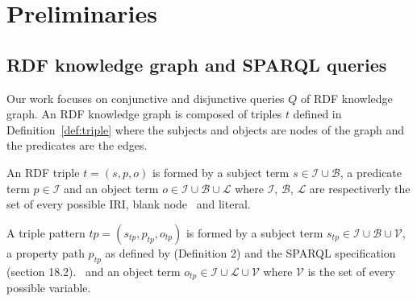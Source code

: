\section{Preliminaries}






\subsection{RDF knowledge graph and SPARQL queries}
Our work focuses on conjunctive and disjunctive queries $Q$ of RDF knowledge graph.
An RDF knowledge graph is composed of triples $t$ defined in Definition~\ref{def:triple} where the subjects and objects are nodes of the graph and the predicates are the edges.

\begin{definition}\label{def:triple}
    An RDF triple $t = (s,p,o)$ is formed by a subject term $s \in \mathcal{I} \cup \mathcal{B}$, a predicate term  $p \in \mathcal{I}$ and an object term $o \in \mathcal{I} \cup \mathcal{B} \cup \mathcal{L}$
    where $\mathcal{I}$, $\mathcal{B}$, $\mathcal{L}$ are respectiverly the set of every possible IRI, blank node~ and literal.
\end{definition}

\begin{definition}\label{def:triplePattern}
    A triple pattern $tp = (s_{tp},p_{tp},o_{tp})$ is formed by a subject term $s_{tp} \in \mathcal{I} \cup \mathcal{B} \cup \mathcal{V}$, 
    a property path  $p_{tp}$ as defined by  \citeauthor{Kostylev2015} (Definition 2) and the SPARQL specification (section 18.2).~ 
    and an object term  $o_{tp} \in \mathcal{I} \cup \mathcal{L} \cup \mathcal{V}$ 
    where $\mathcal{V}$ is the set of every possible variable. 
\end{definition}


